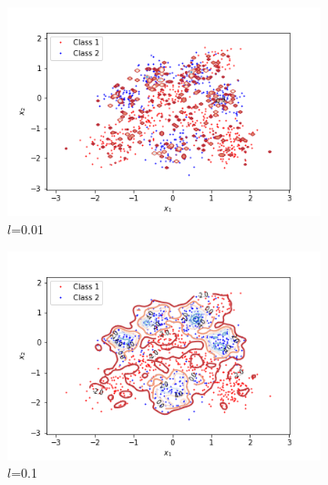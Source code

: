 \documentclass[a4paper]{article}
\begin{document}
    \begin{figure}[h!]
        \begin{subfigure}{0.32\textwidth}
            \label{fig:nonlinear_predictive_distribution_0.01}
            \centering
            \includegraphics[width=\textwidth]{plots/predictive_distribution_nonlinear_w=0.01.png}
            \caption{$l$=0.01}
        \end{subfigure}
        \begin{subfigure}{0.32\textwidth}
            \label{fig:nonlinear_predictive_distribution_0.1}
            \centering
            \includegraphics[width=\textwidth]{plots/predictive_distribution_nonlinear_w=0.1.png}
            \caption{$l$=0.1}
        \end{subfigure}
        \begin{subfigure}{0.32\textwidth}
            \label{fig:nonlinear_predictive_distribution_1}

\end{subfigure}
\end{figure}
\end{document}
